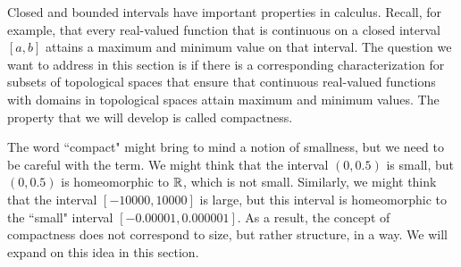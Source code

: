 \label{sec:Compact_topology}


\vspace*{-17 pt}

\vspace*{13 pt}


Closed and bounded intervals have important properties in calculus. Recall, for example, that every real-valued function that is continuous on a closed interval $[a, b]$ attains a maximum and minimum value on that interval. The question we want to address in this section is if there is a corresponding characterization for subsets of topological spaces that ensure that continuous real-valued functions with domains in topological spaces attain maximum and minimum values. The property that we will develop is called compactness.

The word ``compact" might bring to mind a notion of smallness, but we need to be careful with the term. We might think that the interval $(0, 0.5)$ is small, but $(0, 0.5)$ is homeomorphic to $\mathbb{R}$, which is not small. Similarly, we might think that the interval $[-10000, 10000]$ is large, but this interval is homeomorphic to the ``small" interval $[-0.00001, 0.000001]$. As a result, the concept of compactness does not correspond to size, but rather structure, in a way. We will expand on this idea in this section. 


